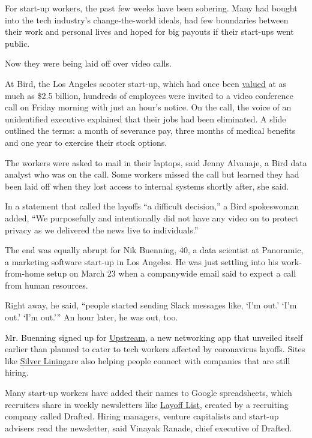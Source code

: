 For start-up workers, the past few weeks have been sobering. Many had
bought into the tech industry's change-the-world ideals, had few
boundaries between their work and personal lives and hoped for big
payouts if their start-ups went public.

Now they were being laid off over video calls.

At Bird, the Los Angeles scooter start-up, which had once been
\href{https://www.nytimes3xbfgragh.onion/2019/07/22/technology/bird-scooters-valuation.html}{valued}
at as much as \$2.5 billion, hundreds of employees were invited to a
video conference call on Friday morning with just an hour's notice. On
the call, the voice of an unidentified executive explained that their
jobs had been eliminated. A slide outlined the terms: a month of
severance pay, three months of medical benefits and one year to exercise
their stock options.

The workers were asked to mail in their laptops, said Jenny Alvauaje, a
Bird data analyst who was on the call. Some workers missed the call but
learned they had been laid off when they lost access to internal systems
shortly after, she said.

In a statement that called the layoffs ``a difficult decision,'' a Bird
spokeswoman added, ``We purposefully and intentionally did not have any
video on to protect privacy as we delivered the news live to
individuals.''

The end was equally abrupt for Nik Buenning, 40, a data scientist at
Panoramic, a marketing software start-up in Los Angeles. He was just
settling into his work-from-home setup on March 23 when a companywide
email said to expect a call from human resources.

Right away, he said, ``people started sending Slack messages like, `I'm
out.' `I'm out.' `I'm out.''' An hour later, he was out, too.

Mr. Buenning signed up for \href{https://upstreamapp.com/}{Upstream}, a
new networking app that unveiled itself earlier than planned to cater to
tech workers affected by coronavirus layoffs. Sites like
\href{https://www.getsilverlining.com/}{Silver Lining}are also helping
people connect with companies that are still hiring.

Many start-up workers have added their names to Google spreadsheets,
which recruiters share in weekly newsletters like
\href{https://www.layoffs.tech/}{Layoff List}, created by a recruiting
company called Drafted. Hiring managers, venture capitalists and
start-up advisers read the newsletter, said Vinayak Ranade, chief
executive of Drafted.

